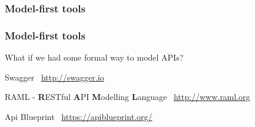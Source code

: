 \subsubsection{Model-first tools}

\begin{frame} %
	\frametitle{Model-first tools}
	
	What if we had some formal way to model APIs?
	
	\begin{exampleblock}{Swagger}
		 \swaggerlogo\ \url{http://swagger.io}
	\end{exampleblock}
	
	\begin{exampleblock}{RAML - \textbf{R}ESTful \textbf{A}PI \textbf{M}odelling \textbf{L}anguage}	
		\ramllogo\ \url{http://www.raml.org}
	\end{exampleblock}
	
	\begin{exampleblock}{Api Blueprint}
	 	\blueprintlogo\ \url{https://apiblueprint.org/}
	\end{exampleblock}
\end{frame}
